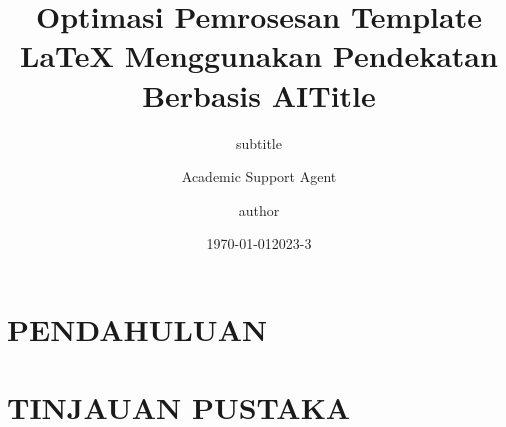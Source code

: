 \documentclass{beamer}
\title{Optimasi Pemrosesan Template LaTeX Menggunakan Pendekatan Berbasis AI}
\author{Academic Support Agent}
\date{\today}
\begin{document}
\maketitle

\begin{abstract}

\end{abstract}

\chapter{PENDAHULUAN}


\chapter{TINJAUAN PUSTAKA}


\usepackage{amsfonts,amsmath,oldgerm}
\usepackage{xeCJK}

\newcommand{\testcolor}[1]{\colorbox{#1}{\textcolor{#1}{test}}~\texttt{#1}}



\newcommand{\hrefcol}[2]{\textcolor{cyan}{\href{#1}{#2}}}

\title{Title}
\subtitle{subtitle}
\author{author}
\date{2023-3}
\end{document}
